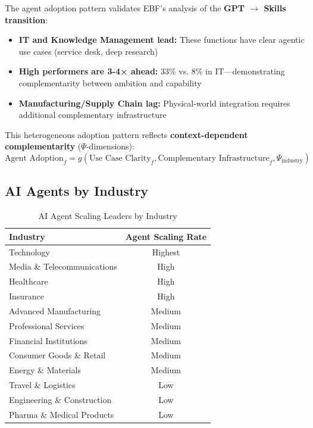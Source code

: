 \begin{tcolorbox}[colback=green!5!white, colframe=green!75!black,
    title=EBF Framework Implication: Agent Adoption = Skills Paradigm]

The agent adoption pattern validates EBF's analysis of the \textbf{GPT $\to$ Skills transition}:

\begin{itemize}
\item \textbf{IT and Knowledge Management lead:} These functions have clear agentic use cases (service desk, deep research)
\item \textbf{High performers are 3-4× ahead:} 33\% vs. 8\% in IT---demonstrating complementarity between ambition and capability
\item \textbf{Manufacturing/Supply Chain lag:} Physical-world integration requires additional complementary infrastructure
\end{itemize}

This heterogeneous adoption pattern reflects \textbf{context-dependent complementarity} ($\Psi$-dimensions):
\begin{equation}
\text{Agent Adoption}_f = g(\text{Use Case Clarity}_f, \text{Complementary Infrastructure}_f, \Psi_{\text{industry}})
\end{equation}

\end{tcolorbox}


\subsection{AI Agents by Industry}

\begin{table}[htbp]
\centering
\caption{AI Agent Scaling Leaders by Industry}
\label{tab:vvv1-industry}
\renewcommand{\arraystretch}{1.3}
\begin{tabular}{@{}lc@{}}
\toprule
\textbf{Industry} & \textbf{Agent Scaling Rate} \\
\midrule
Technology & Highest \\
Media \& Telecommunications & High \\
Healthcare & High \\
Insurance & High \\
Advanced Manufacturing & Medium \\
Professional Services & Medium \\
Financial Institutions & Medium \\
Consumer Goods \& Retail & Medium \\
Energy \& Materials & Medium \\
Travel \& Logistics & Low \\
Engineering \& Construction & Low \\
Pharma \& Medical Products & Low \\
\bottomrule
\end{tabular}
\end{table}


